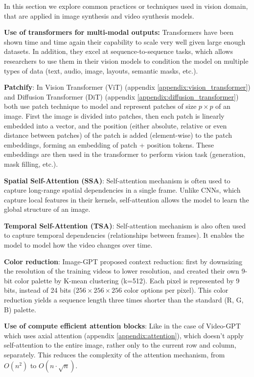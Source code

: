 In this section we explore common practices or techniques used in vision domain, that are applied in image synthesis and video synthesis models.

\textbf{Use of transformers for multi-modal outputs:} Transformers have been shown time and time again their capability to scale very well given large enough datasets. In addition, they excel at sequence-to-sequence tasks, which allows researchers to use them in their vision models to condition the model on multiple types of data (text, audio, image, layouts, semantic masks, etc.).

\textbf{Patchify}: In Vision Transformer (ViT) \cite{vision_transformer} (appendix \ref{appendix:vision_transformer}) and Diffusion Transformer (DiT) \cite{diffusion_transformer} (appendix \ref{appendix:diffusion_transformer}) both use patch technique to model and represent patches of size $p \times p$ of an image. First the image is divided into patches, then each patch is linearly embedded into a vector, and the position (either absolute, relative or even distance between patches) of the patch is added (element-wise) to the patch embeddings, forming an embedding of patch + position tokens. These embeddings are then used in the transformer to perform vision task (generation, mask filling, etc.).

\textbf{Spatial Self-Attention (SSA)}: Self-attention mechanism is often used to capture long-range spatial dependencies in a single frame. Unlike CNNs, which capture local features in their kernels, self-attention allows the model to learn the global structure of an image.

\textbf{Temporal Self-Attention (TSA)}: Self-attention mechanism is also often used to capture temporal dependencies (relationships between frames). It enables the model to model how the video changes over time.

\textbf{Color reduction}: Image-GPT \cite{imagegpt} proposed context reduction: first by downsizing the resolution of the training videos to lower resolution, and created their own 9-bit color palette by K-mean clustering (k=512). Each pixel is represented by 9 bits, instead of 24 bits ($256\times 256\times 256$ color options per pixel). This color reduction yields a sequence length three times shorter than the standard (R, G, B) palette.

\textbf{Use of compute efficient attention blocks}: Like in the case of Video-GPT \cite{videogpt} which uses axial attention (appendix \ref{appendix:attention}), which doesn't apply self-attention to the entire image, rather only to the current row and column, separately. This reduces the complexity of the attention mechanism, from $O(n^2)$ to $O(n \cdot \sqrt{n})$.


